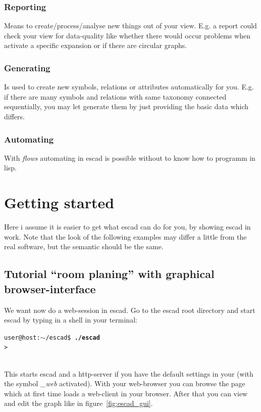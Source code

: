 \documentclass[a4paper, 12pt, openany]{scrbook}
\makeatletter
\newcommand{\shellcmdline}[2]{\\
  \setlength{\fboxsep}{2pt}\colorbox{black!20}{\parbox{\textwidth}{\texttt{user@host:$\sim$/escad\$ \textbf{#1}\\#2}}}\\}
\makeatother
\begin{document}
\subsection{Reporting}
Means to create/process/analyse new things out of your view. E.g. a report could check your view for data-quality like whether there would occur problems when activate a specific expansion or if there are circular graphs.
\subsection{Generating}
Is used to create new symbols, relations or attributes automatically for you. E.g. if there are many symbols and relations with same taxonomy connected sequentially, you may let generate them by just providing the basic data which differs.
\subsection{Automating}
With \emph{flows} automating in escad is possible without to know how to programm in lisp.
\chapter{Getting started}\label{cha:gettingstarted}
Here i assume it is easier to get what escad can do for you, by showing escad in work. Note that the look of the following examples may differ a little from the real software, but the semantic should be the same.
\section{Tutorial ``room planing'' with graphical browser-interface}
We want now do a web-session in escad. Go to the escad root directory and start escad by typing in a shell in your terminal:
\shellcmdline{./escad}{>}
This starts escad and a http-server if you have the default settings in your  (with the symbol \emph{\_web} activated). With your web-browser you can browse the page which at first time loads a web-client in your browser. After that you can view and edit the graph like in figure~\ref{fig:escad_gui}.
\end{document}
